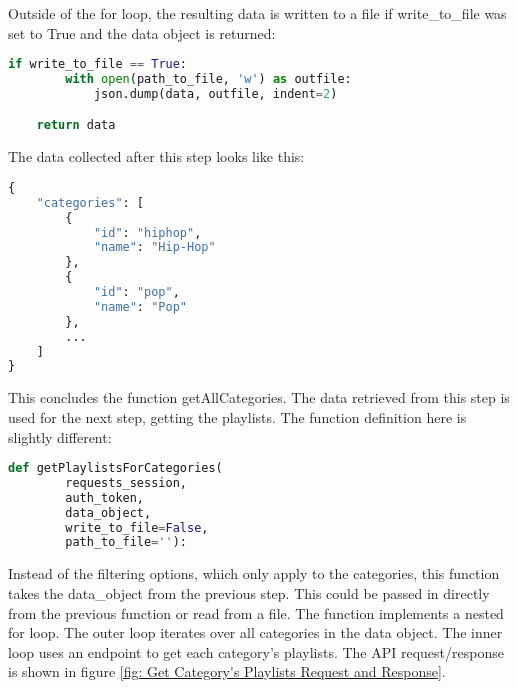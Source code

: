 Outside of the for loop, the resulting data is written to a file if write\_to\_file was set to True and the 
data object is returned:


\begin{lstlisting}[language=Python]
    if write_to_file == True:
        with open(path_to_file, 'w') as outfile:
            json.dump(data, outfile, indent=2)

    return data
\end{lstlisting}

The data collected after this step looks like this:

\begin{lstlisting}[language=Python]
{
    "categories": [
        {
            "id": "hiphop",
            "name": "Hip-Hop"
        },
        {
            "id": "pop",
            "name": "Pop"
        },
        ...
    ]
}
\end{lstlisting}


This concludes the function getAllCategories.
The data retrieved from this step is used for the next step, getting the playlists.
The function definition here is slightly different:

\begin{lstlisting}[language=Python]
    def getPlaylistsForCategories(
        requests_session,
        auth_token,
        data_object,
        write_to_file=False,
        path_to_file=''):
\end{lstlisting}

Instead of the filtering options, which only apply to the categories, this function takes the data\_object from the
previous step. This could be passed in directly from the previous function or read from a file.
The function implements a nested for loop. The outer loop iterates over all categories in the data object.
The inner loop uses an endpoint to get each category's playlists. The API request/response is shown in figure \ref{fig: Get Category's Playlists Request and Response}.

